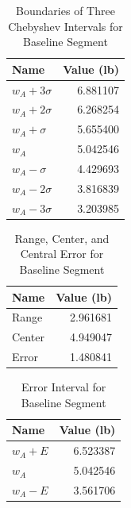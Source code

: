 \begin{table}[ht]
    \centering
    \begin{tabular}{|l|r|}
        \hline
        \textbf{Name} & \textbf{Value (lb)} \\
        \hline
        $w_{A} + 3 \sigma$ & 6.881107 \\
        $w_{A} + 2 \sigma$ & 6.268254 \\
        $w_{A} + \sigma$ & 5.655400 \\
        \hline
        $w_{A}$ & 5.042546 \\
        \hline
        $w_{A} - \sigma$ & 4.429693 \\
        $w_{A} - 2 \sigma$ & 3.816839 \\
        $w_{A} - 3 \sigma$ & 3.203985 \\
        \hline
    \end{tabular}
    \caption{Boundaries of Three Chebyshev Intervals for Baseline Segment}
    \label{table:00.baseline.chebyshev}
\end{table}
\begin{table}[ht]
    \centering
	\begin{tabular}{|l|r|} \hline
		\textbf{Name} & \textbf{Value (lb)} \\
		\hline
		Range & 2.961681 \\
	    Center & 4.949047 \\
		Error & 1.480841 \\
		\hline
	\end{tabular}
    \caption{Range, Center, and Central Error for Baseline Segment}
    \label{table:00.baseline.range}
\end{table}
\begin{table}[ht]
    \centering
	\begin{tabular}{|l|r|} \hline
		\textbf{Name} & \textbf{Value (lb)} \\
		\hline
        $w_{A} + E$ & 6.523387 \\
        $w_{A}$ & 5.042546 \\
        $w_{A} - E$ & 3.561706 \\
		\hline
	\end{tabular}
    \caption{Error Interval for Baseline Segment}
    \label{table:00.baseline.interval}
\end{table}

